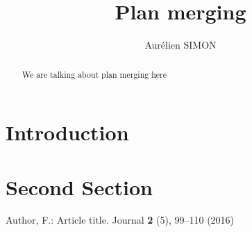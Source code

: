 \documentclass{llncs}
\begin{document}
\title{Plan merging}

\author{Aurélien SIMON}
\maketitle

\begin{abstract}
We are talking about plan merging here
\end{abstract}

\section{Introduction}

\section{Second Section}
\begin{thebibliography}{8}
Author, F.: Article title. Journal \textbf{2} (5), 99--110 (2016)

\end{thebibliography}
\end{document}
